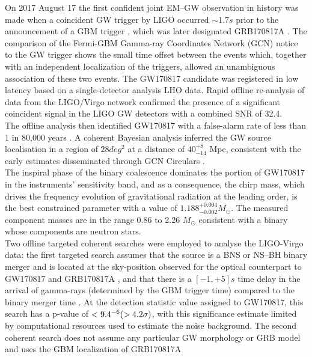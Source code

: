 \documentclass[binding=0.6cm, LaM]{sapthesis}
\begin{document}
	On 2017 August 17 the first confident joint EM–GW observation in history was made when 
	a coincident GW trigger by LIGO occurred $\sim1.7s$ prior to the announcement of a GBM trigger \cite{147},
	which was later designated GRB170817A \cite{140}.
	The comparison of the Fermi-GBM Gamma-ray Coordinates Network (GCN) notice to the GW 
	trigger shows the small time offset between the events which, together with an independent localization of the triggers,
	allowed an unambiguous association of these two events. 
	The GW170817 candidate was registered in low latency \cite{112,114}
	based on a single-detector analysis LHO data. 
	Rapid offline re-analysis \cite{28,111} of data from the LIGO/Virgo network 
	confirmed the presence of a significant coincident signal in the LIGO GW detectors with a combined SNR of 32.4. \\
	The offline analysis then identified GW170817 with a false-alarm rate of less than 1 in 80,000 years \cite{61}. 
	A coherent Bayesian analysis \cite{59,152}
	inferred the GW source localisation in a region of $28 deg^2$ at a distance of $40^{+8}_{-14}$ Mpc, 
	consistent with the early estimates disseminated through GCN Circulars \cite{55,60}. \\ 
	The inspiral phase of the binary coalescence dominates 
	the portion of GW170817 in the instruments’ sensitivity band, 
	and as a consequence, the chirp mass, which drives the frequency evolution of gravitational radiation at the leading order, 
	is the best constrained parameter with a value of $1.188^{+0.004}_{-0.002}M_\odot$.
	The measured component masses are in the range 0.86 to 2.26 $M_\odot$
	consistent with a binary whose components are neutron stars. \\
	Two offline targeted coherent searches were employed to analyse the LIGO-Virgo data: 
	the first targeted search \cite{111,116,213}
	assumes that the source is a BNS or NS–BH binary merger and is located at the sky-position 
	observed for the optical counterpart to GW170817 and GRB170817A \cite{55,136}, 
	and that there is a $[-1, +5] s$ time delay in the arrival of gamma-rays (determined by the GBM trigger time) 
	compared to the binary merger time \cite{55}. 
	At the detection statistic value assigned to GW170817, this search has a p-value of $<9.4\time 10^{-6}(>4.2\sigma)$, 
	with this significance estimate limited by computational resources used to estimate the noise background. 
	The second coherent search does not assume any particular GW morphology or GRB model 
	\cite{55,144,145} and uses the GBM localization of GRB170817A 	
\end{document}
